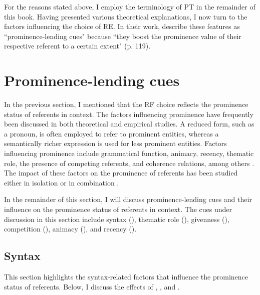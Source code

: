 For the reasons stated above, I employ the terminology of PT in the remainder of this book. Having presented various theoretical explanations, I now turn to the factors influencing the choice of RE. In their work, \citet{Heusinger2019} describe these features as ``prominence-lending cues" because ``they boost the prominence value of their respective referent to a certain extent" (p. 119).


\section{Prominence-lending cues}\label{sec:lingfactors}
\begin{sloppypar}
In the previous section, I mentioned that the RF choice reflects the prominence status of referents in context. The factors influencing prominence have frequently been discussed in both theoretical and empirical studies.
A reduced form, such as a pronoun, is often employed to refer to prominent entities, whereas a semantically richer expression is used for less prominent entities. Factors influencing prominence include grammatical function, animacy, recency, thematic role, the presence of competing referents, and coherence relations, among others \citep{Brennan1995, fukumura2011effect, arnold2007effect, ariel1990accessing}. The impact of these factors on the prominence of referents has been studied either in isolation \citep{arnold2007effect} or in combination \citep{ariel1990accessing}.
\end{sloppypar}

In the remainder of this section, I will discuss prominence-lending cues and their influence on the prominence status of referents in context. The cues under discussion in this section include syntax (), thematic role (), givenness (), competition (), animacy (), and recency ().


\subsection{Syntax}\label{subsec:syntax}

This section highlights the syntax-related factors that influence the prominence status of referents. Below, I discuss the effects of , , and .

